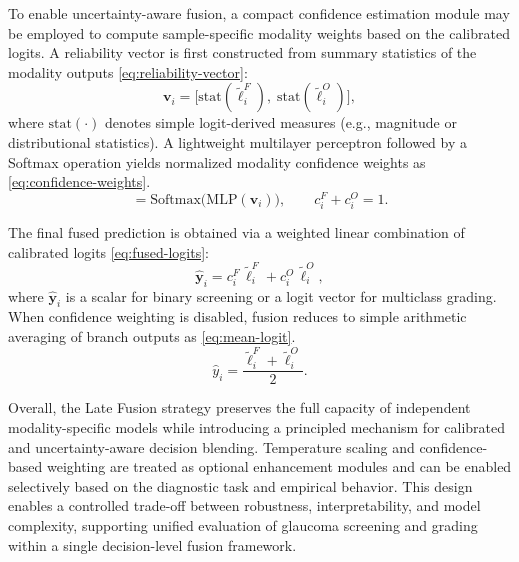 \documentclass[preprint,12pt]{elsarticle}
\newcommand{\eqrefp}[1]{\eqref{#1}}
\begin{document}
To enable uncertainty-aware fusion, a compact confidence estimation module may be employed to compute sample-specific modality weights based on the calibrated logits. A reliability vector is first constructed from summary statistics of the modality outputs \eqrefp{eq:reliability-vector}:
\begin{equation}
    \mathbf{v}_i =
    \bigl[
        \mathrm{stat}(\tilde{\boldsymbol{\ell}}_i^{F}),
        \;
        \mathrm{stat}(\tilde{\boldsymbol{\ell}}_i^{O})
        \bigr],
    \label{eq:reliability-vector}
\end{equation}
where $\mathrm{stat}(\cdot)$ denotes simple logit-derived measures (e.g., magnitude or distributional statistics). A lightweight multilayer perceptron followed by a Softmax operation yields normalized modality confidence weights as \eqrefp{eq:confidence-weights}.
\begin{equation}
    [\,c_i^{F}, c_i^{O}\,] =
    \mathrm{Softmax}\!\bigl(\mathrm{MLP}(\mathbf{v}_i)\bigr),
    \qquad
    c_i^{F} + c_i^{O} = 1.
    \label{eq:confidence-weights}
\end{equation}

The final fused prediction is obtained via a weighted linear combination of calibrated logits \eqrefp{eq:fused-logits}:
\begin{equation}
    \hat{\boldsymbol{y}}_i =
    c_i^{F}\,\tilde{\boldsymbol{\ell}}_i^{F}
    +
    c_i^{O}\,\tilde{\boldsymbol{\ell}}_i^{O},
    \label{eq:fused-logits}
\end{equation}
where $\hat{\boldsymbol{y}}_i$ is a scalar for binary screening or a logit vector for multiclass grading. When confidence weighting is disabled, fusion reduces to simple arithmetic averaging of branch outputs as \eqrefp{eq:mean-logit}.
\begin{equation}
    \hat{y}_i = \frac{\tilde{\ell}_i^{F} + \tilde{\ell}_i^{O}}{2}.
    \label{eq:mean-logit}
\end{equation}

Overall, the Late Fusion strategy preserves the full capacity of independent modality-specific models while introducing a principled mechanism for calibrated and uncertainty-aware decision blending. Temperature scaling and confidence-based weighting are treated as optional enhancement modules and can be enabled selectively based on the diagnostic task and empirical behavior. This design enables a controlled trade-off between robustness, interpretability, and model complexity, supporting unified evaluation of glaucoma screening and grading within a single decision-level fusion framework.
\end{document}
